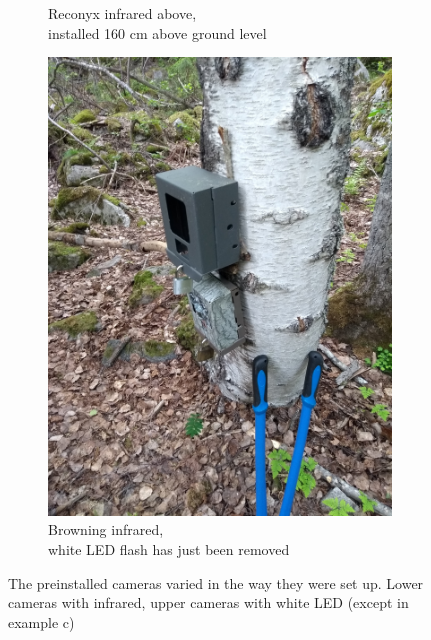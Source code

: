 \begin{figure}
\begin{subfigure}{.5\textwidth}
		  \caption{Reconyx infrared above,\\ installed 160 cm above ground level}
		  	\label{fig:cam_ex_c}
	\end{subfigure}
		\begin{subfigure}{.5\textwidth}
		  \centering
		  	\includegraphics[width=.8\linewidth]{./img/cam_install_example/IMG_20190529_181049340.jpg}
		  \caption{Browning infrared,\\ white LED flash has just been removed}
		  	\label{fig:cam_ex_d}
	\end{subfigure}
		\caption{The preinstalled cameras varied in the way they were set up. Lower cameras with infrared, upper cameras with white LED (except in example c)}
	\label{fig:cam_ex_main}
\end{figure}


